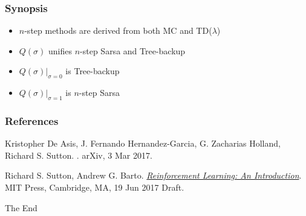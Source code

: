 \documentclass{beamer}
\begin{document}
\begin{frame}
  \frametitle{Synopsis}
  \begin{itemize}
    \item $n$-step methods are derived from both MC and TD($\lambda$)
    \item $Q(\sigma)$ unifies $n$-step Sarsa and Tree-backup
    \item $Q(\sigma)|_{\sigma=0}$ is Tree-backup
    \item $Q(\sigma)|_{\sigma=1}$ is $n$-step Sarsa
  \end{itemize}
\end{frame}

\begin{frame}
  \frametitle<presentation>{References}

  \begin{thebibliography}{10}

  \beamertemplatebookbibitems

  \beamertemplatearticlebibitems

    Kristopher De Asis, J. Fernando Hernandez-Garcia, G. Zacharias Holland,
    Richard S. Sutton.
    .
    \newblock arXiv, 3 Mar 2017.

   Richard S. Sutton, Andrew G. Barto.
    \newblock
    {\href{http://incompleteideas.net/sutton/book/the-book-2nd.html}{\em
      Reinforcement Learning: An Introduction}}.
    \newblock MIT Press, Cambridge, MA, 19 Jun 2017 Draft.

  \end{thebibliography}
\end{frame}


\begin{frame}
\Huge{\centerline{The End}}
\end{frame}

\end{document}
